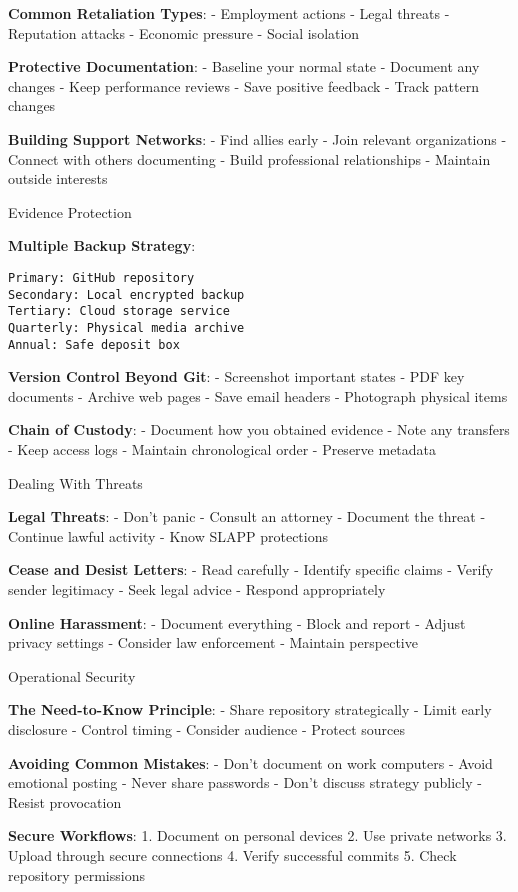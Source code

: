 \textbf{Common Retaliation Types}: - Employment actions - Legal threats
- Reputation attacks - Economic pressure - Social isolation

\textbf{Protective Documentation}: - Baseline your normal state -
Document any changes - Keep performance reviews - Save positive feedback
- Track pattern changes

\textbf{Building Support Networks}: - Find allies early - Join relevant
organizations - Connect with others documenting - Build professional
relationships - Maintain outside interests

Evidence Protection

\textbf{Multiple Backup Strategy}:

\begin{verbatim}
Primary: GitHub repository
Secondary: Local encrypted backup
Tertiary: Cloud storage service
Quarterly: Physical media archive
Annual: Safe deposit box
\end{verbatim}

\textbf{Version Control Beyond Git}: - Screenshot important states - PDF
key documents - Archive web pages - Save email headers - Photograph
physical items

\textbf{Chain of Custody}: - Document how you obtained evidence - Note
any transfers - Keep access logs - Maintain chronological order -
Preserve metadata

Dealing With Threats

\textbf{Legal Threats}: - Don't panic - Consult an attorney - Document
the threat - Continue lawful activity - Know SLAPP protections

\textbf{Cease and Desist Letters}: - Read carefully - Identify specific
claims - Verify sender legitimacy - Seek legal advice - Respond
appropriately

\textbf{Online Harassment}: - Document everything - Block and report -
Adjust privacy settings - Consider law enforcement - Maintain
perspective

Operational Security

\textbf{The Need-to-Know Principle}: - Share repository strategically -
Limit early disclosure - Control timing - Consider audience - Protect
sources

\textbf{Avoiding Common Mistakes}: - Don't document on work computers -
Avoid emotional posting - Never share passwords - Don't discuss strategy
publicly - Resist provocation

\textbf{Secure Workflows}: 1. Document on personal devices 2. Use
private networks 3. Upload through secure connections 4. Verify
successful commits 5. Check repository permissions

